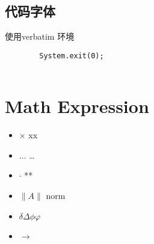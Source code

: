 \documentclass[utf8]{ctexart}
\begin{document}
		\subsection{代码字体}
		\noindent	 
		使用verbatim 环境 

		\begin{verbatim}
		System.exit(0);
				
		\end{verbatim}
		\section{Math Expression}
		\begin{itemize}
				\item $\times $ xx
				\item $\ldots$ \ldots
				\item $\cdot $ **
				\item $\|A\| $ norm
				\item	$\delta \Delta \phi \varphi$
				\item $\to $

		\end{itemize}
		
\end{document}
